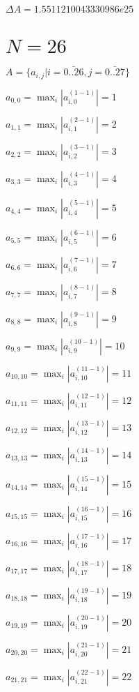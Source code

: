 \documentclass[a4paper,12pt]{article}
\begin{document}
$\Delta A = 1.5511210043330986e25$



\section{ $N = 26$ }
$A = \{ a _{ i, j } | i = \bar { 0..26 }, j = \bar { 0..27 } \}$

$a _{ 0, 0 } =  \max _i |a _{ i, 0 } ^{ (1 - 1) } | = 1$

$a _{ 1, 1 } =  \max _i |a _{ i, 1 } ^{ (2 - 1) } | = 2$

$a _{ 2, 2 } =  \max _i |a _{ i, 2 } ^{ (3 - 1) } | = 3$

$a _{ 3, 3 } =  \max _i |a _{ i, 3 } ^{ (4 - 1) } | = 4$

$a _{ 4, 4 } =  \max _i |a _{ i, 4 } ^{ (5 - 1) } | = 5$

$a _{ 5, 5 } =  \max _i |a _{ i, 5 } ^{ (6 - 1) } | = 6$

$a _{ 6, 6 } =  \max _i |a _{ i, 6 } ^{ (7 - 1) } | = 7$

$a _{ 7, 7 } =  \max _i |a _{ i, 7 } ^{ (8 - 1) } | = 8$

$a _{ 8, 8 } =  \max _i |a _{ i, 8 } ^{ (9 - 1) } | = 9$

$a _{ 9, 9 } =  \max _i |a _{ i, 9 } ^{ (10 - 1) } | = 10$

$a _{ 10, 10 } =  \max _i |a _{ i, 10 } ^{ (11 - 1) } | = 11$

$a _{ 11, 11 } =  \max _i |a _{ i, 11 } ^{ (12 - 1) } | = 12$

$a _{ 12, 12 } =  \max _i |a _{ i, 12 } ^{ (13 - 1) } | = 13$

$a _{ 13, 13 } =  \max _i |a _{ i, 13 } ^{ (14 - 1) } | = 14$

$a _{ 14, 14 } =  \max _i |a _{ i, 14 } ^{ (15 - 1) } | = 15$

$a _{ 15, 15 } =  \max _i |a _{ i, 15 } ^{ (16 - 1) } | = 16$

$a _{ 16, 16 } =  \max _i |a _{ i, 16 } ^{ (17 - 1) } | = 17$

$a _{ 17, 17 } =  \max _i |a _{ i, 17 } ^{ (18 - 1) } | = 18$

$a _{ 18, 18 } =  \max _i |a _{ i, 18 } ^{ (19 - 1) } | = 19$

$a _{ 19, 19 } =  \max _i |a _{ i, 19 } ^{ (20 - 1) } | = 20$

$a _{ 20, 20 } =  \max _i |a _{ i, 20 } ^{ (21 - 1) } | = 21$

$a _{ 21, 21 } =  \max _i |a _{ i, 21 } ^{ (22 - 1) } | = 22$
\end{document}
